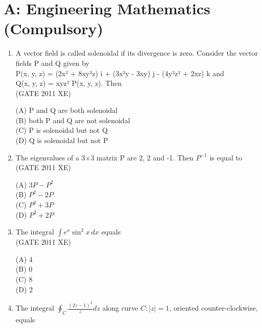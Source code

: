 \documentclass[journal,12pt,onecolumn]{IEEEtran}
\begin{document}
\section*{A: Engineering Mathematics (Compulsory)}
\begin{enumerate}
\bigskip

\item A vector field is called solenoidal if its divergence is zero. Consider the vector fields P and Q given by \\
P(x, y, z) = (2x² + 8xy²z) i + (3x²y - 3xy) j - (4y²z² + 2xz) k and \\
Q(x, y, z) = xyz² P(x, y, z). Then \\

\hfill{(GATE 2011 XE)} \\
\begin{multicols}{2}
(A) P and Q are both solenoidal \\
(B) both P and Q are not solenoidal \\
(C) P is solenoidal but not Q \\
(D) Q is solenoidal but not P
\end{multicols}

\item The eigenvalues of a 3×3 matrix P are 2, 2 and -1. Then $P^{-1}$ is equal to \\

\hfill{(GATE 2011 XE)} \\
\begin{multicols}{4}
(A) $3P - P^2$ \\
(B) $P^2 - 2P$ \\
(C) $P^2 + 3P$ \\
(D) $P^2 + 2P$
\end{multicols}

\item The integral $\int e^x \sin^2 x \, dx$ equals \\

\hfill{(GATE 2011 XE)} \\
\begin{multicols}{4}
(A) 4 \\
(B) 0 \\
(C) 8 \\
(D) 2
\end{multicols}

\item The integral $\oint_C \frac{(2z-1)^3}{z} dz$ along curve $C: |z| = 1$, oriented counter-clockwise, equals \\


\end{enumerate}
\end{document}
